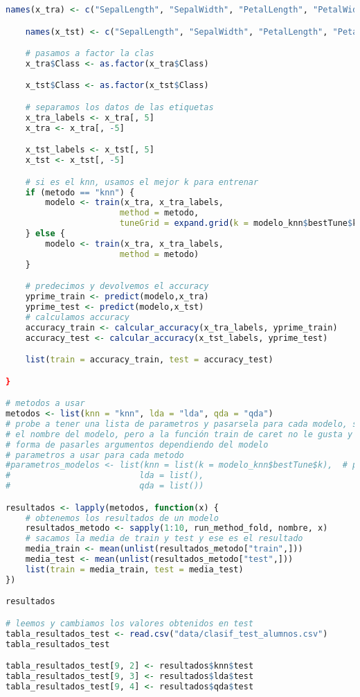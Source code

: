 \begin{lstlisting}[language=R]
	names(x_tra) <- c("SepalLength", "SepalWidth", "PetalLength", "PetalWidth", "Class")

	names(x_tst) <- c("SepalLength", "SepalWidth", "PetalLength", "PetalWidth", "Class")

	# pasamos a factor la clas
	x_tra$Class <- as.factor(x_tra$Class)

	x_tst$Class <- as.factor(x_tst$Class)

	# separamos los datos de las etiquetas
	x_tra_labels <- x_tra[, 5]
	x_tra <- x_tra[, -5]

	x_tst_labels <- x_tst[, 5]
	x_tst <- x_tst[, -5]

	# si es el knn, usamos el mejor k para entrenar
	if (metodo == "knn") {
		modelo <- train(x_tra, x_tra_labels,
					   method = metodo,
					   tuneGrid = expand.grid(k = modelo_knn$bestTune$k))
	} else {
		modelo <- train(x_tra, x_tra_labels,
					   method = metodo)
	}

	# predecimos y devolvemos el accuracy
	yprime_train <- predict(modelo,x_tra)
	yprime_test <- predict(modelo,x_tst)
	# calculamos accuracy
	accuracy_train <- calcular_accuracy(x_tra_labels, yprime_train)
	accuracy_test <- calcular_accuracy(x_tst_labels, yprime_test)

	list(train = accuracy_train, test = accuracy_test)

}

# metodos a usar
metodos <- list(knn = "knn", lda = "lda", qda = "qda")
# probe a tener una lista de parametros y pasarsela para cada modelo, sabiendo
# el nombre del modelo, pero a la función train de caret no le gusta y no he encontrado
# forma de pasarles argumentos dependiendo del modelo
# parametros a usar para cada metodo
#parametros_modelos <- list(knn = list(k = modelo_knn$bestTune$k),  # para knn escogemos la mejor k obtenida
#						   lda = list(),
#						   qda = list())

resultados <- lapply(metodos, function(x) {
	# obtenemos los resultados de un modelo
	resultados_metodo <- sapply(1:10, run_method_fold, nombre, x)
	# sacamos la media de train y test y ese es el resultado
	media_train <- mean(unlist(resultados_metodo["train",]))
	media_test <- mean(unlist(resultados_metodo["test",]))
	list(train = media_train, test = media_test)
})

resultados

# leemos y cambiamos los valores obtenidos en test
tabla_resultados_test <- read.csv("data/clasif_test_alumnos.csv")
tabla_resultados_test

tabla_resultados_test[9, 2] <- resultados$knn$test
tabla_resultados_test[9, 3] <- resultados$lda$test
tabla_resultados_test[9, 4] <- resultados$qda$test


\end{lstlisting}

